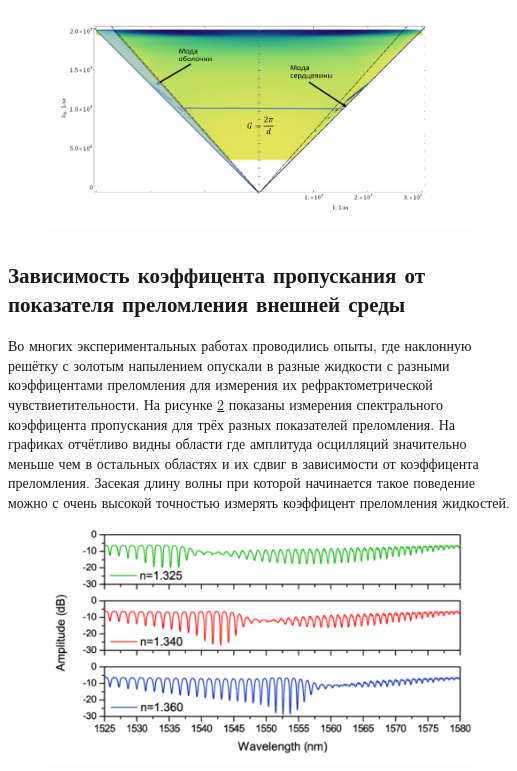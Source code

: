 \begin{figure}[h]
	\centering
	\includegraphics[width=0.9\linewidth]{screenshot012}
	\caption{}
	\label{fig:screenshot012}
\end{figure}



\subsection{Зависимость коэффицента пропускания от показателя преломления внешней среды}
 Во многих экспериментальных работах проводились опыты, где наклонную решётку с золотым напылением опускали в разные жидкости с разными коэффицентами преломления для измерения их рефрактометрической чувствиетительности. На рисунке \ref{fig:screenshot010} показаны измерения спектрального коэффицента пропускания для трёх разных показателей преломления. На графиках отчётливо видны области где амплитуда осцилляций значительно меньше чем в остальных областях и их сдвиг в зависимости от коэффицента преломления.
 Засекая длину волны при которой начинается такое поведение можно с очень высокой точностью измерять коэффицент преломления жидкостей.







 
 \begin{figure}[h]
 	\centering
 	\includegraphics[width=0.7\linewidth]{screenshot010}
 	\caption{}
 	\label{fig:screenshot010}
 \end{figure}
 
